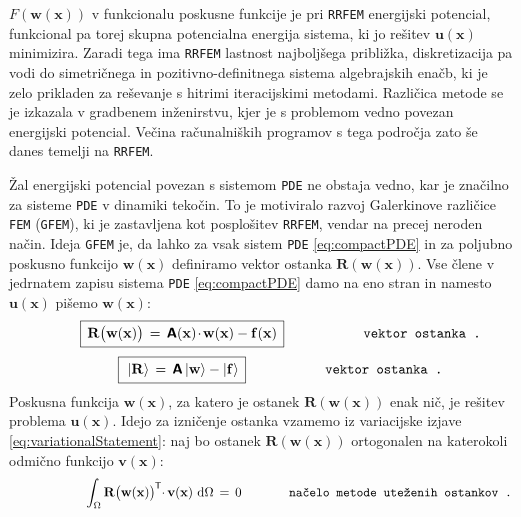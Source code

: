 $F\left(\mathbf{w}(\mathbf{x})\right)$ v funkcionalu poskusne funkcije je pri \texttt{RRFEM} energijski potencial, funkcional pa torej skupna potencialna energija sistema, ki jo rešitev $\mathbf{u}(\mathbf{x})$ minimizira. Zaradi tega ima \texttt{RRFEM} last\-nost najboljšega približka, diskretizacija pa vodi do simetričnega in pozitivno-definitnega sistema algebrajskih enačb, ki je zelo prikladen za reševanje s hitrimi iteracijskimi metodami. Različica metode se je izkazala v gradbenem inženirstvu, kjer je s problemom vedno povezan energijski potencial. Večina računalniških programov s tega področja zato še danes temelji na \texttt{RRFEM}.

Žal energijski potencial povezan s sistemom \texttt{PDE} ne obstaja vedno, kar je značilno za sisteme \texttt{PDE} v dinamiki tekočin. To je motiviralo razvoj Galerkinove različice \texttt{FEM} (\texttt{GFEM}), ki je zastavljena kot posplošitev \texttt{RRFEM}, vendar na precej neroden način. Ideja \texttt{GFEM} je, da lahko za vsak sistem \texttt{PDE} \eqref{eq:compactPDE} in za poljubno poskusno funkcijo $\mathbf{w(x)}$ definiramo vektor ostanka $\mathbf{R(w(x))}$. Vse člene v jedrnatem zapisu sistema \texttt{PDE} \eqref{eq:compactPDE} damo na eno stran in namesto $\mathbf{u(x)}$ pišemo $\mathbf{w(x)}$:
\begin{equation}
	\hspace{10mm} \boxed{\, \vphantom{\big(}
		\mathbf{R\big(w(x)\big)} \, = \, \mathbsf{A}(\mathbf{x}) \mkern-2.5mu \cdot \mkern-2mu \mathbf{w(x)} - \mathbf{f(x)} \,
	}\hspace{20mm} \texttt{vektor ostanka .}
	\label{eq:residual1}
\end{equation}
\begin{equation}
	\hspace{10mm} \boxed{\, \vphantom{\big(}
		\ket{\mathbf{R}} \, = \, \mathbsf{A} \ket{\mathbf{w}} - \ket{\mathbf{f}} \,
	}\hspace{20mm} \texttt{vektor ostanka .}
	\label{eq:residual}
\end{equation}
Poskusna funkcija $\mathbf{w(x)}$, za katero je ostanek $\mathbf{R(w(x))}$ enak nič, je rešitev problema $\mathbf{u(x)}$. Idejo za izničenje ostanka vzamemo iz variacijske izjave \eqref{eq:variationalStatement}: naj bo ostanek $\mathbf{R(w(x))}$ ortogonalen na katerokoli odmično funkcijo $\mathbf{v(x)}$:
\begin{equation}
	\hspace{21mm} \int_{\Omega} \mathbf{R\big(w(x)\big)}^\mathsf{\mkern-1mu T} \mkern-4.5mu \cdot \mkern-1mu \mathbf{v(x)} \ \ud \Omega \, = \, 0 \hspace{13mm} \texttt{načelo metode uteženih ostankov .}
	\label{eq:GfemStatement1}
\end{equation}
